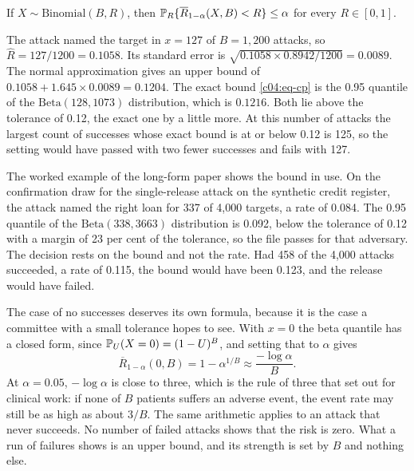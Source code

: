 \begin{proposition}\label{c04:prop-cp}
If $X \sim \mathrm{Binomial}(B,R)$, then
$\mathbb{P}_R\{\overline{R}_{1-\alpha}(X,B) < R\} \le \alpha$ for every $R \in [0,1]$.
\end{proposition}

\begin{example}\label{c04:ex-naledi}
The attack named the target in $x = 127$ of $B = 1{,}200$ attacks, so
$\widehat{R} = 127/1200 = 0.1058$. Its standard error is
$\sqrt{0.1058 \times 0.8942/1200} = 0.0089$. The normal approximation gives an upper
bound of $0.1058 + 1.645 \times 0.0089 = 0.1204$. The exact bound
\eqref{c04:eq-cp} is the 0.95 quantile of the $\mathrm{Beta}(128, 1073)$ distribution,
which is $0.1216$. Both lie above the tolerance of 0.12, the exact one by a little more.
At this number of attacks the largest count of successes whose exact bound is at or
below 0.12 is 125, so the setting would have passed with two fewer successes and fails
with 127.
\end{example}

\begin{example}\label{c04:ex-pass}
The worked example of the long-form paper shows the bound in use. On the confirmation
draw for the single-release attack on the synthetic credit register, the attack named
the right loan for 337 of 4,000 targets, a rate of 0.084. The 0.95 quantile of the
$\mathrm{Beta}(338, 3663)$ distribution is 0.092, below the tolerance of 0.12 with a
margin of 23 per cent of the tolerance, so the file passes for that adversary.
The decision rests on the bound and not the rate. Had 458 of the 4,000 attacks succeeded, a rate of 0.115, the bound would have been
0.123, and the release would have failed.
\end{example}

The case of no successes deserves its own formula, because it is the case a committee
with a small tolerance hopes to see. With $x = 0$ the beta quantile has a closed form,
since $\mathbb{P}_U(X = 0) = (1-U)^B$, and setting that to $\alpha$ gives
\begin{equation}\label{c04:eq-cp0}
\overline{R}_{1-\alpha}(0,B) = 1 - \alpha^{1/B} \approx \frac{-\log\alpha}{B}.
\end{equation}
At $\alpha = 0.05$, $-\log\alpha$ is close to three, which is the rule of three that
\citet{hanley1983} set out for clinical work: if none of $B$ patients suffers an adverse
event, the event rate may still be as high as about $3/B$. The same arithmetic applies
to an attack that never succeeds. No number of failed attacks shows that the risk is
zero. What a run of failures shows is an upper bound, and its strength is set by $B$
and nothing else.

